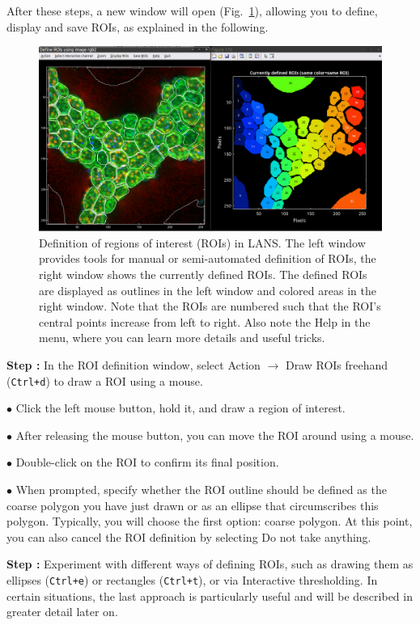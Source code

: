 \documentclass[a4paper, 11pt]{article}
\newcommand{\ttt}[1]{\texttt{#1}}
\newcommand{\lans}[1]{{\color{magenta}#1}}
\newcommand\ra{\rightarrow}
\newcounter{step}
\newcommand\s{\addtocounter{step}{1}\vskip5pt\noindent\textbf{Step \thestep:}{ }}
\newcommand\bul{\vskip5pt\noindent$\bullet${ }}
\begin{document}
\vskip5mm\noindent
After these steps, a new window will open (Fig.~\ref{fig:roi-definition-tool}), allowing you to define, display and save ROIs, as explained in the following.

\begin{figure}[!ht]
\centering
\includegraphics[width=\textwidth]{figs3/LANS-roi-definition-tool}
\caption{\label{fig:roi-definition-tool}%
Definition of regions of interest (ROIs) in LANS. The left window provides tools for manual or semi-automated definition of ROIs, the right window shows the currently defined ROIs. The defined ROIs are displayed as outlines in the left window and colored areas in the right window. Note that the ROIs are numbered such that the ROI's central points increase from left to right. Also note the Help in the menu, where you can learn more details and useful tricks.}
\end{figure}

\setcounter{step}{0}

\s In the ROI definition window, select \lans{Action} $\ra$ \lans{Draw ROIs freehand} (\ttt{Ctrl+d}) to draw a ROI using a mouse.

\bul Click the left mouse button, hold it, and draw a region of interest. 

\bul After releasing the mouse button, you can move the ROI around using a mouse. 

\bul Double-click on the ROI to confirm its final position.

\bul When prompted, specify whether the ROI outline should be defined as the \lans{coarse polygon} you have just drawn or as an \lans{ellipse that circumscribes} this polygon. Typically, you will choose the first option: coarse polygon. At this point, you can also cancel the ROI definition by selecting \lans{Do not take anything}.

\s Experiment with different ways of defining ROIs, such as drawing them as \lans{ellipses} (\ttt{Ctrl+e}) or \lans{rectangles} (\ttt{Ctrl+t}), or via \lans{Interactive thresholding}. In certain situations, the last approach is particularly useful and will be described in greater detail later on.
\end{document}
